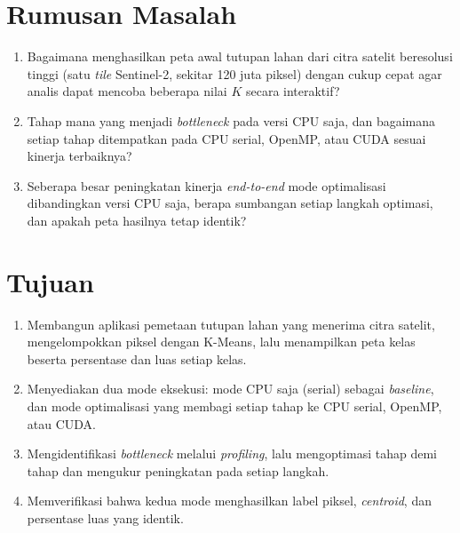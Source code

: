 \section{Rumusan Masalah}
\begin{enumerate}
    \item Bagaimana menghasilkan peta awal tutupan lahan dari citra satelit beresolusi tinggi (satu \emph{tile} Sentinel-2, sekitar 120 juta piksel) dengan cukup cepat agar analis dapat mencoba beberapa nilai $K$ secara interaktif?
    \item Tahap mana yang menjadi \emph{bottleneck} pada versi CPU saja, dan bagaimana setiap tahap ditempatkan pada CPU serial, OpenMP, atau CUDA sesuai kinerja terbaiknya?
    \item Seberapa besar peningkatan kinerja \emph{end-to-end} mode optimalisasi dibandingkan versi CPU saja, berapa sumbangan setiap langkah optimasi, dan apakah peta hasilnya tetap identik?
\end{enumerate}

\section{Tujuan}
\begin{enumerate}
    \item Membangun aplikasi pemetaan tutupan lahan yang menerima citra satelit, mengelompokkan piksel dengan K-Means, lalu menampilkan peta kelas beserta persentase dan luas setiap kelas.
    \item Menyediakan dua mode eksekusi: mode CPU saja (serial) sebagai \emph{baseline}, dan mode optimalisasi yang membagi setiap tahap ke CPU serial, OpenMP, atau CUDA.
    \item Mengidentifikasi \emph{bottleneck} melalui \emph{profiling}, lalu mengoptimasi tahap demi tahap dan mengukur peningkatan pada setiap langkah.
    \item Memverifikasi bahwa kedua mode menghasilkan label piksel, \emph{centroid}, dan persentase luas yang identik.
\end{enumerate}

